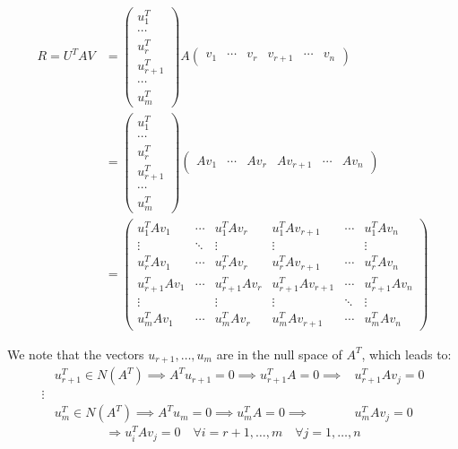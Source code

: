 \documentclass[a4paper, 12pt]{article}
\begin{document}
\[
\begin{aligned}
    R = U^T A V &= \begin{pmatrix}
        u_1^T \\
        \cdots \\
        u_r^T \\
        u_{r+1}^T \\
        \cdots \\
        u_m^T
        \end{pmatrix} A \begin{pmatrix}
        v_1 & \cdots & v_r & v_{r+1} & \cdots & v_n
        \end{pmatrix} \\
    &= \begin{pmatrix}
            u_1^T \\
            \cdots \\
            u_r^T \\
            u_{r+1}^T \\
            \cdots \\
            u_m^T
        \end{pmatrix}
        \begin{pmatrix}
            Av_1 & \cdots & Av_r & Av_{r+1} & \cdots & Av_n
        \end{pmatrix} \\
    &= \begin{pmatrix}
        u_1^T A v_1 & \cdots & u_1^T A v_r & u_1^T A v_{r+1} & \cdots & u_1^T A v_n \\
        \vdots & \ddots & \vdots & \vdots & & \vdots \\
        u_r^T A v_1 & \cdots & u_r^T A v_r & u_r^T A v_{r+1} & \cdots & u_r^T A v_n \\
        u_{r+1}^T A v_1 & \cdots & u_{r+1}^T A v_r & u_{r+1}^T A v_{r+1} & \cdots & u_{r+1}^T A v_n \\
        \vdots & & \vdots & \vdots & \ddots & \vdots \\
        u_m^T A v_1 & \cdots & u_m^T A v_r & u_m^T A v_{r+1} & \cdots & u_m^T A v_n
        \end{pmatrix}
\end{aligned}
\]

We note that the vectors \( u_{r+1}, \ldots, u_m \) are in the null space of \( A^T \), which leads to:
\[
\begin{aligned}
&u_{r+1}^T \in N(A^T) \implies A^T u_{r+1} = 0 \implies u_{r+1}^T A = 0 \implies &u_{r+1}^T A v_j = 0 \\
\vdots \\
&u_m^T \in N(A^T) \implies A^T u_m = 0 \implies u_m^T A = 0 \implies &u_m^T A v_j = 0 
\end{aligned}
\]
$$ \Rightarrow u_i^TAv_j = 0 \quad \forall i = r+1, \dots, m \quad \forall j = 1, \dots, n $$
\end{document}
